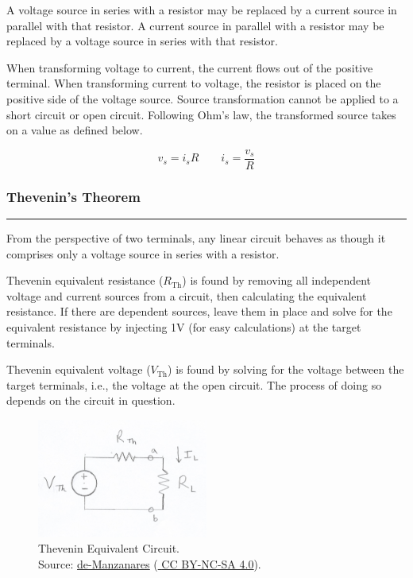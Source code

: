 \documentclass{article}
\begin{document}
    A voltage source in series with a resistor may be replaced by a current source in parallel with that resistor.
    A current source in parallel with a resistor may be replaced by a voltage source in series with that resistor.

    When transforming voltage to current, the current flows out of the positive terminal.
    When transforming current to voltage, the resistor is placed on the positive side of the voltage source.
    Source transformation cannot be applied to a short circuit or open circuit.
    Following Ohm's law, the transformed source takes on a value as defined below.

    \[
        v_s = i_s R     \qquad   i_s = \frac{v_s}{R}
    \]

    \pagebreak
    \smallskip
    \subsubsection*{Thevenin's Theorem}
    \vspace{-1em}
    \rule{\linewidth}{0.1mm}

    \smallskip\noindent
    From the perspective of two terminals, any linear circuit behaves as though it comprises only a voltage source in series with a resistor.

    Thevenin equivalent resistance ($R_\text{Th}$) is found by removing all independent voltage and current sources from a circuit, then calculating the equivalent resistance.
    If there are dependent sources, leave them in place and solve for the equivalent resistance by injecting 1V (for easy calculations) at the target terminals.

    Thevenin equivalent voltage ($V_\text{Th}$) is found by solving for the voltage between the target terminals, i.e., the voltage at the open circuit.
    The process of doing so depends on the circuit in question.

    \begin{figure}[htbp]
        \centering
        \includegraphics[width=0.5\textwidth]{TheveninEquivalent}
        \vspace{-1em}
        \caption{Thevenin Equivalent Circuit. \\
        Source:
        \href{https://github.com/de-Manzanares}
        {\color{blue}\underline{de-Manzanares}}
        (\href{https://creativecommons.org/licenses/by-nc-sa/4.0/deed.en}{\color{blue} \underline{CC BY-NC-SA 4.0}}).}

        \label{fig:thev-eq}
    \end{figure}
\end{document}
